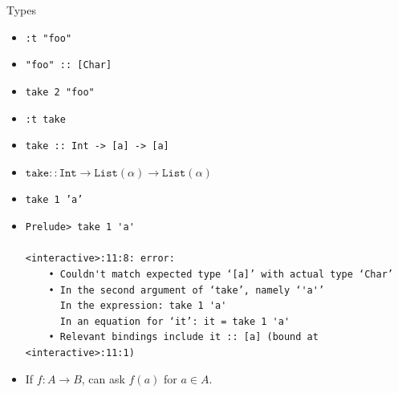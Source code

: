 \documentclass[8pt]{beamer}
\newcommand{\raw}[1]{\texttt{#1}}
\newcommand{\hs}[1]{\texttt{#1}}
\begin{document}
\begin{frame}[fragile]{Types}
\begin{itemize}
\item \raw{:t "foo"} \pause
\item \hs{"foo" :: [Char]}
\item \hs{take 2 "foo"} \pause
\item \raw{:t take}
\item \hs{take :: Int -> [a] -> [a]} \pause
\item $\texttt{take} :: \texttt{Int} \rightarrow \texttt{List}(\alpha) \rightarrow \texttt{List}(\alpha)$
\item \hs{take 1 'a'} \pause
\item
\begin{verbatim}
Prelude> take 1 'a'

<interactive>:11:8: error:
    • Couldn't match expected type ‘[a]’ with actual type ‘Char’
    • In the second argument of ‘take’, namely ‘'a'’
      In the expression: take 1 'a'
      In an equation for ‘it’: it = take 1 'a'
    • Relevant bindings include it :: [a] (bound at <interactive>:11:1)
\end{verbatim}
\pause
\item If $f: A \rightarrow B$, \pause can ask $f(a)$ for $a \in A$.
\end{itemize}
\end{frame}
\end{document}
